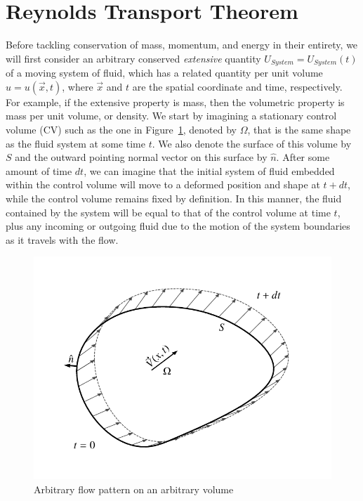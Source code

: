 \section{Reynolds Transport Theorem}
Before tackling conservation of mass, momentum, and energy in their entirety, we will first consider an arbitrary conserved {\it extensive} quantity $U_{System} = U_{System}(t)$ of a moving system of fluid, which has a related quantity per unit volume $u = u(\vec{x},t)$, where $\vec{x}$ and $t$ are the spatial coordinate and time, respectively. For example, if the extensive property is mass, then the volumetric property is mass per unit volume, or density. We start by imagining a stationary control volume (CV) such as the one in Figure~\ref{fig:reynolds_transport_volume}, denoted by $\Omega$, that is the same shape as the fluid system at some time $t$. We also denote the surface of this volume by $S$ and the outward pointing normal vector on this surface by $\hat{n}$. After some amount of time $dt$, we can imagine that the initial system of fluid embedded within the control volume will move to a deformed position and shape at $t + dt$, while the control volume remains fixed by definition. In this manner, the fluid contained by the system will be equal to that of the control volume at time $t$, plus any incoming or outgoing fluid due to the motion of the system boundaries as it travels with the flow.
\begin{figure}[htbp]
	\centering
	\includegraphics[width=0.5\linewidth]{Pictures/reytrans_volume}
	\caption{Arbitrary flow pattern on an arbitrary volume}
	\label{fig:reynolds_transport_volume}
\end{figure}

